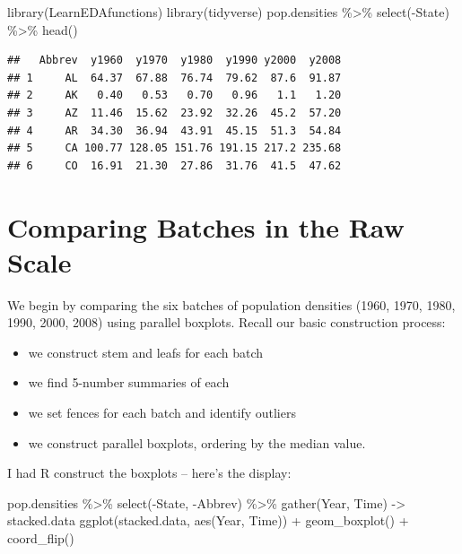 \documentclass[
]{book}
\newenvironment{Shaded}{\begin{snugshade}}{\end{snugshade}}
\newcommand{\FunctionTok}[1]{\textcolor[rgb]{0.00,0.00,0.00}{#1}}
\newcommand{\NormalTok}[1]{#1}
\newcommand{\OtherTok}[1]{\textcolor[rgb]{0.56,0.35,0.01}{#1}}
\newcommand{\SpecialCharTok}[1]{\textcolor[rgb]{0.00,0.00,0.00}{#1}}
\providecommand{\tightlist}{%
  \setlength{\itemsep}{0pt}\setlength{\parskip}{0pt}}
\begin{document}
\begin{Shaded}
\begin{Highlighting}[]
\FunctionTok{library}\NormalTok{(LearnEDAfunctions)}
\FunctionTok{library}\NormalTok{(tidyverse)}
\NormalTok{pop.densities }\SpecialCharTok{\%\textgreater{}\%} \FunctionTok{select}\NormalTok{(}\SpecialCharTok{{-}}\NormalTok{State) }\SpecialCharTok{\%\textgreater{}\%} \FunctionTok{head}\NormalTok{()}
\end{Highlighting}
\end{Shaded}

\begin{verbatim}
##   Abbrev  y1960  y1970  y1980  y1990 y2000  y2008
## 1     AL  64.37  67.88  76.74  79.62  87.6  91.87
## 2     AK   0.40   0.53   0.70   0.96   1.1   1.20
## 3     AZ  11.46  15.62  23.92  32.26  45.2  57.20
## 4     AR  34.30  36.94  43.91  45.15  51.3  54.84
## 5     CA 100.77 128.05 151.76 191.15 217.2 235.68
## 6     CO  16.91  21.30  27.86  31.76  41.5  47.62
\end{verbatim}

\hypertarget{comparing-batches-in-the-raw-scale}{%
\section{Comparing Batches in the Raw Scale}\label{comparing-batches-in-the-raw-scale}}

We begin by comparing the six batches of population densities (1960, 1970, 1980, 1990, 2000, 2008) using parallel boxplots. Recall our basic construction process:

\begin{itemize}
\tightlist
\item
  we construct stem and leafs for each batch
\item
  we find 5-number summaries of each
\item
  we set fences for each batch and identify outliers
\item
  we construct parallel boxplots, ordering by the median value.
\end{itemize}

I had R construct the boxplots -- here's the display:

\begin{Shaded}
\begin{Highlighting}[]
\NormalTok{pop.densities }\SpecialCharTok{\%\textgreater{}\%} \FunctionTok{select}\NormalTok{(}\SpecialCharTok{{-}}\NormalTok{State, }\SpecialCharTok{{-}}\NormalTok{Abbrev) }\SpecialCharTok{\%\textgreater{}\%} 
   \FunctionTok{gather}\NormalTok{(Year, Time) }\OtherTok{{-}\textgreater{}}\NormalTok{ stacked.data}
\FunctionTok{ggplot}\NormalTok{(stacked.data, }\FunctionTok{aes}\NormalTok{(Year, Time)) }\SpecialCharTok{+}
  \FunctionTok{geom\_boxplot}\NormalTok{() }\SpecialCharTok{+} \FunctionTok{coord\_flip}\NormalTok{()}
\end{Highlighting}
\end{Shaded}
\end{document}
